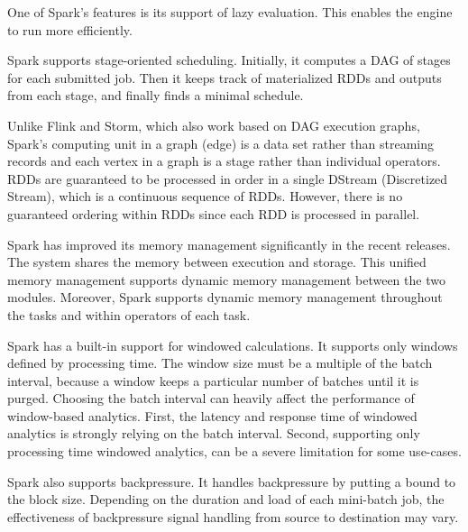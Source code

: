 

One of Spark's features is its support of lazy evaluation. This enables the engine to run more efficiently. 

Spark  supports stage-oriented scheduling. Initially, it computes a DAG  of stages for each submitted job.  Then it keeps track of materialized  RDDs and outputs from each  stage, and finally finds a minimal schedule. 

Unlike Flink and Storm, which also work based on DAG execution graphs, Spark's computing unit in a graph (edge) is a data set rather than streaming records and each vertex in a graph is a stage rather than individual operators. RDDs are guaranteed to be processed in order in a single DStream (Discretized Stream), which  is a continuous sequence of RDDs. However, there is no guaranteed ordering within RDDs  since each RDD is processed in parallel. 

Spark has improved its memory management significantly in the recent releases. The system shares the memory  between execution and storage. This unified memory management supports dynamic memory management between the two modules. Moreover, Spark supports dynamic memory management throughout the tasks and within operators of each task. 

Spark has a built-in support for windowed calculations. It supports only windows defined by processing time. The window size must be a multiple of the batch interval, because a window keeps a particular number of batches until it is purged. Choosing the  batch interval can heavily affect the performance of window-based analytics. First, the latency and response time of windowed analytics is strongly relying on the batch interval. Second, supporting only processing time windowed analytics, can be a severe limitation for some use-cases.


Spark also supports backpressure. It handles backpressure by putting a bound to the block size. Depending on the duration and load of each mini-batch job, the effectiveness of backpressure signal handling from source to destination may vary. 

